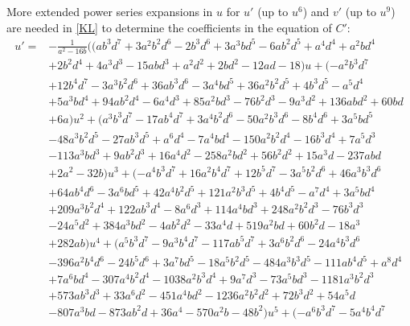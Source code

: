 \documentclass[microtype]{gtpart}     %
\theoremstyle{remark}
\theoremstyle{definition}
\begin{document}
More extended power series expansions in $u$ for $u'$ (up to $u^6$) and $v'$ 
(up to $u^9$) are needed in \eqref{KL} to determine the coefficients in the 
equation of $C'$: 
\begin{equation*}
\begin{split}
 u' = & -\frac{1}{a^2 - 16 b} \big( (a b^3 d^7 + 3 a^2 b^2 d^6 - 2 b^3 d^6 + 3 a^3 b d^5 - 6 a b^2 d^5 + a^4 d^4 + a^2 b d^4 \\
      & + 2 b^2 d^4 + 4 a^3 d^3 - 15 a b d^3 + a^2 d^2 + 2 b d^2 - 12 a d - 18) u + (-a^2 b^3 d^7 \\
      & + 12 b^4 d^7 - 3 a^3 b^2 d^6 + 36 a b^3 d^6 - 3 a^4 b d^5 + 36 a^2 b^2 d^5 + 4 b^3 d^5 - a^5 d^4 \\
      & + 5 a^3 b d^4 + 94 a b^2 d^4 - 6 a^4 d^3 + 85 a^2 b d^3 - 76 b^2 d^3 - 9 a^3 d^2 + 136 a b d^2 + 60 b d \\
      & + 6 a) u^2 + (a^3 b^3 d^7 - 17 a b^4 d^7 + 3 a^4 b^2 d^6 - 50 a^2 b^3 d^6 - 8 b^4 d^6 + 3 a^5 b d^5 \\
      & - 48 a^3 b^2 d^5 - 27 a b^3 d^5 + a^6 d^4 - 7 a^4 b d^4 - 150 a^2 b^2 d^4 - 16 b^3 d^4 + 7 a^5 d^3 \\
      & - 113 a^3 b d^3 + 9 a b^2 d^3 + 16 a^4 d^2 - 258 a^2 b d^2 + 56 b^2 d^2 + 15 a^3 d - 237 a b d \\
      & + 2 a^2 - 32 b) u^3 + (-a^4 b^3 d^7 + 16 a^2 b^4 d^7 + 12 b^5 d^7 - 3 a^5 b^2 d^6 + 46 a^3 b^3 d^6 \\
      & + 64 a b^4 d^6 - 3 a^6 b d^5 + 42 a^4 b^2 d^5 + 121 a^2 b^3 d^5 + 4 b^4 d^5 - a^7 d^4 + 3 a^5 b d^4 \\
      & + 209 a^3 b^2 d^4 + 122 a b^3 d^4 - 8 a^6 d^3 + 114 a^4 b d^3 + 248 a^2 b^2 d^3 - 76 b^3 d^3 \\
      & - 24 a^5 d^2 + 384 a^3 b d^2 - 4 a b^2 d^2 - 33 a^4 d + 519 a^2 b d + 60 b^2 d - 18 a^3 \\
      & + 282 a b) u^4 + (a^5 b^3 d^7 - 9 a^3 b^4 d^7 - 117 a b^5 d^7 + 3 a^6 b^2 d^6 - 24 a^4 b^3 d^6 \\
      & - 396 a^2 b^4 d^6 - 24 b^5 d^6 + 3 a^7 b d^5 - 18 a^5 b^2 d^5 - 484 a^3 b^3 d^5 - 111 a b^4 d^5 + a^8 d^4 \\
      & + 7 a^6 b d^4 - 307 a^4 b^2 d^4 - 1038 a^2 b^3 d^4 + 9 a^7 d^3 - 73 a^5 b d^3 - 1181 a^3 b^2 d^3 \\
      & + 573 a b^3 d^3 + 33 a^6 d^2 - 451 a^4 b d^2 - 1236 a^2 b^2 d^2 + 72 b^3 d^2 + 54 a^5 d \\
      & - 807 a^3 b d - 873 a b^2 d + 36 a^4 - 570 a^2 b - 48 b^2) u^5 + (-a^6 b^3 d^7 - 5 a^4 b^4 d^7 \\

\end{split}
\end{equation*}
\end{document}
